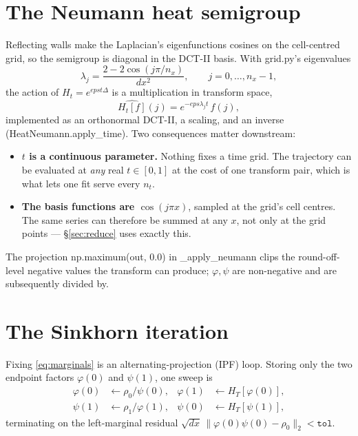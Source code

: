 \documentclass[11pt]{article}
\newcommand{\eps}{\varepsilon}
\newcommand{\dt}{\Delta t}
\newcommand{\dx}{\Delta x}
\newcommand{\code}[1]{\texttt{#1}}
\def\eps{eps}\def\dt{dt}\def\dx{dx}\def\code#1{#1}%
\begin{document}
\section{The Neumann heat semigroup}

Reflecting walls make the Laplacian's eigenfunctions cosines on the
cell-centred grid, so the semigroup is diagonal in the DCT-II basis. With
\code{grid.py}'s eigenvalues
\begin{equation}
  \lambda_j = \frac{2 - 2\cos(j\pi/n_x)}{\dx^2},
  \qquad j = 0,\dots,n_x-1,
  \label{eq:lambda}
\end{equation}
the action of $H_t = e^{\eps t\Delta}$ is a multiplication in transform space,
\begin{equation}
  \widehat{H_t[f]}(j) = e^{-\eps\lambda_j t}\,\hat f(j),
\end{equation}
implemented as an orthonormal DCT-II, a scaling, and an inverse
(\code{HeatNeumann.apply\_time}). Two consequences matter downstream:

\begin{itemize}
  \item \textbf{$t$ is a continuous parameter.} Nothing fixes a time grid. The
        trajectory can be evaluated at \emph{any} real $t\in[0,1]$ at the cost
        of one transform pair, which is what lets one fit serve every $n_t$.
  \item \textbf{The basis functions are $\cos(j\pi x)$}, sampled at the grid's
        cell centres. The same series can therefore be summed at any $x$, not
        only at the grid points --- \S\ref{sec:reduce} uses exactly this.
\end{itemize}

The projection \code{np.maximum(out, 0.0)} in \code{\_apply\_neumann} clips the
round-off-level negative values the transform can produce; $\varphi,\psi$ are
non-negative and are subsequently divided by.

\section{The Sinkhorn iteration}

Fixing \eqref{eq:marginals} is an alternating-projection (IPF) loop. Storing
only the two endpoint factors $\varphi(0)$ and $\psi(1)$, one sweep is
\begin{align}
  \varphi(0) &\leftarrow \rho_0 / \psi(0), &
  \varphi(1) &\leftarrow H_T[\varphi(0)], \\
  \psi(1)    &\leftarrow \rho_1 / \varphi(1), &
  \psi(0)    &\leftarrow H_T[\psi(1)],
\end{align}
terminating on the left-marginal residual
$\sqrt{\dx}\,\|\varphi(0)\psi(0)-\rho_0\|_2 < \texttt{tol}$.
\end{document}
